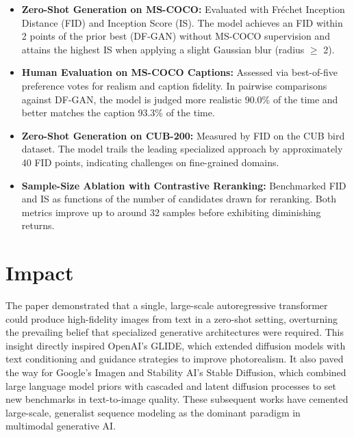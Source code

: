 \documentclass[10pt]{article}
\begin{document}
\begin{itemize}
    \item \textbf{Zero-Shot Generation on MS-COCO:} Evaluated with Fréchet Inception Distance (FID) and Inception Score (IS). The model achieves an FID within 2 points of the prior best (DF-GAN) without MS-COCO supervision and attains the highest IS when applying a slight Gaussian blur (radius \(\ge\) 2).
    \item \textbf{Human Evaluation on MS-COCO Captions:} Assessed via best-of-five preference votes for realism and caption fidelity. In pairwise comparisons against DF-GAN, the model is judged more realistic 90.0\% of the time and better matches the caption 93.3\% of the time.
    \item \textbf{Zero-Shot Generation on CUB-200:} Measured by FID on the CUB bird dataset. The model trails the leading specialized approach by approximately 40 FID points, indicating challenges on fine-grained domains.
    \item \textbf{Sample-Size Ablation with Contrastive Reranking:} Benchmarked FID and IS as functions of the number of candidates drawn for reranking. Both metrics improve up to around 32 samples before exhibiting diminishing returns.
\end{itemize}


\section*{Impact}

The paper demonstrated that a single, large-scale autoregressive transformer could produce high-fidelity images from text in a zero-shot setting, overturning the prevailing belief that specialized generative architectures were required. This insight directly inspired OpenAI's GLIDE\cite{DBLP:journals/corr/abs-2112-10741}, which extended diffusion models with text conditioning and guidance strategies to improve photorealism. It also paved the way for Google's Imagen\cite{saharia2022photorealistictexttoimagediffusionmodels} and Stability AI's Stable Diffusion, which combined large language model priors with cascaded and latent diffusion processes to set new benchmarks in text-to-image quality. These subsequent works have cemented large-scale, generalist sequence modeling as the dominant paradigm in multimodal generative AI.




\end{document}

